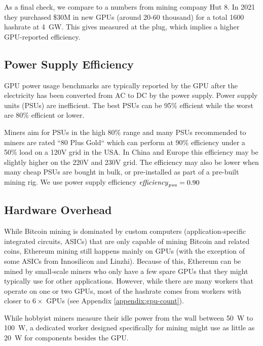 As a final check, we compare to a numbers from mining company Hut 8\cite{pan_ethereum_2021}. In 2021 they purchased \$30M in new GPUs (around 20-60 thousand) for a total \SI{1600}{\giga\hps} hashrate at \SI{4}{\giga\watt}. This gives  measured at the plug, which implies a higher GPU-reported efficiency.

\subsection{Power Supply Efficiency}

GPU power usage benchmarks are typically reported by the GPU after the electricity has been converted from AC to DC by the power supply. Power supply units (PSUs) are inefficient. The best PSUs can be 95\% efficient while the worst are 80\% efficient or lower.

Miners aim for PSUs in the high 80\% range and many PSUs recommended to miners are rated ``80 Plus Gold`` which can perform at 90\% efficiency under a 50\% load on a 120V grid in the USA\cite{mpitziopoulos_what_2018}\cite{mpitziopoulos_best_2021}. In China and Europe this efficiency may be slightly higher on the 220V and 230V grid. The efficiency may also be lower when many cheap PSUs are bought in bulk, or pre-installed as part of a pre-built mining rig. We use power supply efficiency $\mathit{efficiency}_\mathit{psu} = 0.90$

\subsection{Hardware Overhead}

While Bitcoin mining is dominated by custom computers (application-specific integrated circuits, ASICs) that are only capable of mining Bitcoin and related coins, Ethereum mining still happens mainly on GPUs (with the exception of some ASICs from Innosilicon\cite{innosilicon_innosilicon_2021} and Linzhi\cite{linzhi_linzhi_2020}). Because of this, Ethereum can be mined by small-scale miners who only have a few spare GPUs that they might typically use for other applications. However, while there are many workers that operate on one or two GPUs, most of the hashrate comes from workers with closer to $6\times$ GPUs (see Appendix \ref{appendix:gpu-count}).

While hobbyist miners measure their idle power from the wall between \SI{50}{\watt} to \SI{100}{\watt}\cite{frogi5_how_2017}, a dedicated worker designed specifically for mining might use as little as \SI{20}{\watt}\cite{red_panda_mining_testing_2020}\cite{rabid_mining_ethereum_2021} for components besides the GPU.


